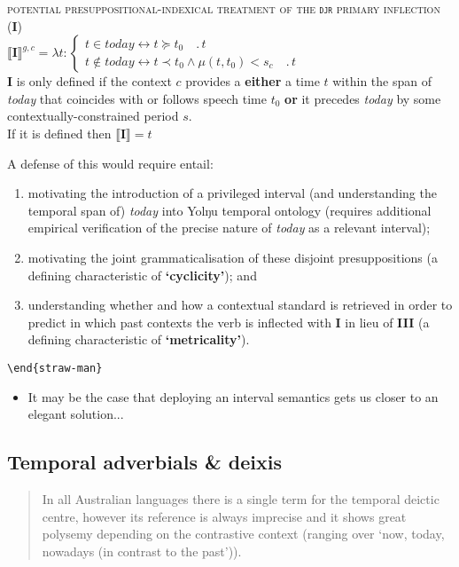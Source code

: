 \documentclass[11pt,dvipsnames]{article}
\begin{document}
\begin{framed}
\noindent \textsc{potential presuppositional-indexical treatment of the \texttt{djr} primary inflection (\textbf{I})}\\
$\llbracket\textbf{I}\rrbracket^{g,c}=\lambda t:\begin{cases}t\in today\leftrightarrow t\succcurlyeq t_0\quad.\,t\\
t\notin today \leftrightarrow t\prec t_0\wedge\mu(t,t_0)<s_c\quad.\,t
\end{cases}$\\
\textbf{I} is only defined if the context $c$ provides a \textbf{either} a time $t$ within the span of \textit{today} that coincides with or follows speech time $t_0$ \textbf{or} it precedes \textit{today} by some contextually-constrained period $s$.\\
If it is defined then $\llbracket\textbf{I}\rrbracket=t$


A defense of this would require entail:
\begin{enumerate}%
	\item motivating the introduction of a privileged interval (and understanding the temporal span of) \textit{today} into Yolŋu temporal ontology (requires additional empirical verification of the precise nature of \textit{today} as a relevant interval);
	\item motivating the joint grammaticalisation of these disjoint presuppositions (a defining characteristic of \textbf{`cyclicity'}); and
	\item understanding whether and how a contextual standard is retrieved in order to predict in which past contexts the verb is inflected with \textbf{I} in lieu of \textbf{III} (a defining characteristic of \textbf{`metricality'}).
\end{enumerate}
\texttt{\textbackslash end\{straw-man\}}
\end{framed}
\begin{itemize}
\item It may be the case that deploying an interval semantics gets us closer to an elegant solution...

\end{itemize}


\subsection*{Temporal adverbials \& deixis}


\begin{quote}
\small	In all Australian languages there is a single term for the temporal deictic centre, however its reference is always imprecise and it shows great polysemy depending on the contrastive context (ranging over ‘now, today, nowadays (in contrast to the past’)).\\\hspace*{\fill}\citep[147]{Austin1998}
\end{quote}
\end{document}
